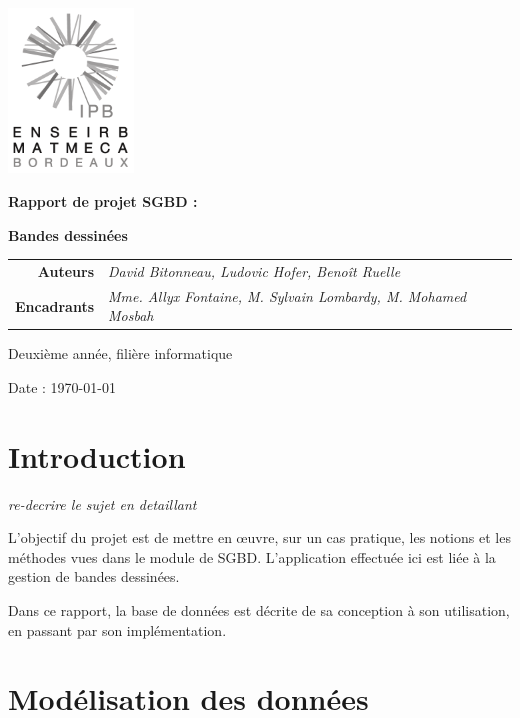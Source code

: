 \documentclass[12pt]{article}
\begin{document}
\thispagestyle{empty}
\noindent\includegraphics[width=0.25\textwidth]{enseirb-matmeca}


\begin{center}
	\Huge{\textbf{Rapport de projet SGBD :}}

	\Huge{\textbf{Bandes dessinées}}
\end{center}


\begin{tabular}{r@{:~}l}
	\textbf{Auteurs} & \textit{David Bitonneau, Ludovic Hofer, Benoît Ruelle}\\
 \textbf{Encadrants} & \textit{Mme. Allyx Fontaine, M. Sylvain Lombardy,
M. Mohamed Mosbah}\\
\end{tabular}


\begin{center}Deuxième année, filière informatique

	Date : \today
\end{center}

\newpage

\section{Introduction}

\emph{re-decrire le sujet en detaillant}

L'objectif du projet est de mettre en œuvre, sur un cas pratique, les notions
et les méthodes vues dans le module de SGBD. L'application effectuée ici est
liée à la gestion de bandes dessinées.

Dans ce rapport, la base de données est décrite de sa conception à son
utilisation, en passant par son implémentation. 

\section{Modélisation des données}
\end{document}
